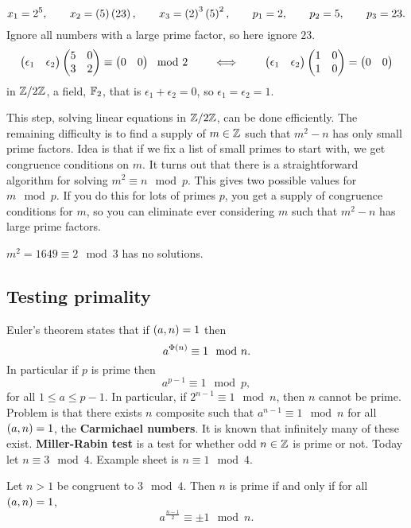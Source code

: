 \begin{example2}
$$ x_1 = 2^5, \qquad x_2 = \left( 5 \right)\left( 23 \right), \qquad x_3 = \left( 2 \right)^3\left( 5 \right)^2, \qquad p_1 = 2, \qquad p_2 = 5, \qquad p_3 = 23. $$
Ignore all numbers with a large prime factor, so here ignore $ 23 $.
$$ \begin{pmatrix} \epsilon_1 & \epsilon_2 \end{pmatrix}\begin{pmatrix} 5 & 0 \\ 3 & 2 \end{pmatrix} \equiv \begin{pmatrix} 0 & 0 \end{pmatrix} \mod 2 \qquad \iff \qquad \begin{pmatrix} \epsilon_1 & \epsilon_2 \end{pmatrix}\begin{pmatrix} 1 & 0 \\ 1 & 0 \end{pmatrix} = \begin{pmatrix} 0 & 0 \end{pmatrix} $$
in $ \mathbb{Z} / 2\mathbb{Z} $, a field, $ \mathbb{F}_2 $, that is $ \epsilon_1 + \epsilon_2 = 0 $, so $ \epsilon_1 = \epsilon_2 = 1 $.
\end{example2}

This step, solving linear equations in $ \mathbb{Z} / 2\mathbb{Z} $, can be done efficiently. The remaining difficulty is to find a supply of $ m \in \mathbb{Z} $ such that $ m^2 - n $ has only small prime factors. Idea is that if we fix a list of small primes to start with, we get congruence conditions on $ m $. It turns out that there is a straightforward algorithm for solving $ m^2 \equiv n \mod p $. This gives two possible values for $ m \mod p $. If you do this for lots of primes $ p $, you get a supply of congruence conditions for $ m $, so you can eliminate ever considering $ m $ such that $ m^2 - n $ has large prime factors.

\begin{example2}
$ m^2 = 1649 \equiv 2 \mod 3 $ has no solutions.
\end{example2}


\subsection{Testing primality}

Euler's theorem states that if $ \left( a, n \right) = 1 $ then
$$ a^{\Phi\left( n \right)} \equiv 1 \mod n. $$
In particular if $ p $ is prime then
$$ a^{p - 1} \equiv 1 \mod p, $$
for all $ 1 \le a \le p - 1 $. In particular, if $ 2^{n - 1} \equiv 1 \mod n $, then $ n $ cannot be prime. Problem is that there exists $ n $ composite such that $ a^{n - 1} \equiv 1 \mod n $ for all $ \left( a, n \right) = 1 $, the \textbf{Carmichael numbers}. It is known that infinitely many of these exist. \textbf{Miller-Rabin test} is a test for whether odd $ n \in \mathbb{Z} $ is prime or not. Today let $ n \equiv 3 \mod 4 $. Example sheet is $ n \equiv 1 \mod 4 $.

\begin{lemma}
\label{lem:30}
Let $ n > 1 $ be congruent to $ 3 \mod 4 $. Then $ n $ is prime if and only if for all $ \left( a, n \right) = 1 $,
$$ a^{\tfrac{n - 1}{2}} \equiv \pm 1 \mod n. $$
\end{lemma}

